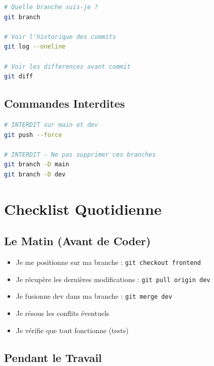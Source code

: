 \documentclass[11pt,a4paper]{article}
\begin{document}
\begin{lstlisting}[language=bash]
# Quelle branche suis-je ?
git branch

# Voir l'historique des commits
git log --oneline

# Voir les differences avant commit
git diff
\end{lstlisting}

\subsection{Commandes Interdites}

\begin{important}
\begin{lstlisting}[language=bash]
# INTERDIT sur main et dev
git push --force

# INTERDIT - Ne pas supprimer ces branches
git branch -D main
git branch -D dev
\end{lstlisting}
\end{important}

\clearpage

\section{Checklist Quotidienne}
\label{sec:checklist}

\subsection{Le Matin (Avant de Coder)}

\begin{itemize}
    \item[$\square$] Je me positionne sur ma branche : \texttt{git checkout frontend}
    \item[$\square$] Je récupère les dernières modifications : \texttt{git pull origin dev}
    \item[$\square$] Je fusionne dev dans ma branche : \texttt{git merge dev}
    \item[$\square$] Je résous les conflits éventuels
    \item[$\square$] Je vérifie que tout fonctionne (tests)
\end{itemize}

\subsection{Pendant le Travail}
\end{document}
